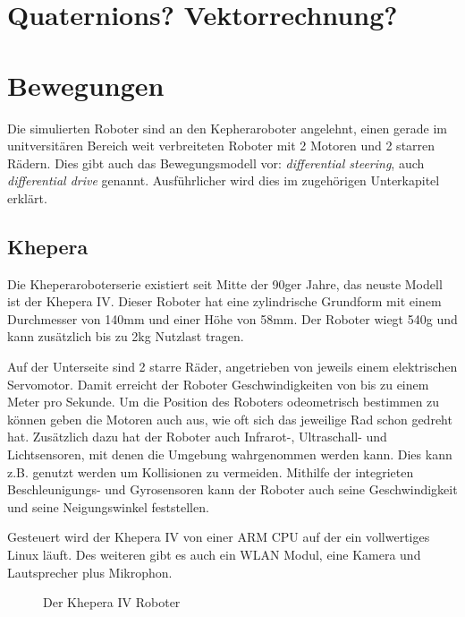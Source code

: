 \clearpage
\section{Quaternions? Vektorrechnung?}

\clearpage
\section{Bewegungen}
Die simulierten Roboter sind an den Kepheraroboter angelehnt, einen gerade im unitversit{\"{a}}ren Bereich weit verbreiteten Roboter mit 2 Motoren und 2 starren R{\"{a}}dern.
Dies gibt auch das Bewegungsmodell vor: \textit{differential steering}, auch \textit{differential drive} genannt. Ausf{\"{u}}hrlicher wird dies im zugeh{\"{o}}rigen Unterkapitel erkl{\"{a}}rt.

\subsection{Khepera}\label{khepera}
Die Kheperaroboterserie existiert seit Mitte der 90ger Jahre, das neuste Modell ist der Khepera IV. Dieser Roboter hat eine zylindrische Grundform mit einem Durchmesser von 140mm und einer
H{\"{o}}he von 58mm. Der Roboter wiegt 540g und kann zus{\"{a}}tzlich bis zu 2kg Nutzlast tragen.

Auf der Unterseite sind 2 starre R{\"{a}}der, angetrieben von jeweils einem elektrischen Servomotor. Damit erreicht der Roboter Geschwindigkeiten von bis zu einem Meter pro Sekunde.
Um die Position des Roboters odeometrisch bestimmen zu k{\"{o}}nnen geben die Motoren auch aus, wie oft sich das jeweilige Rad schon gedreht hat. Zus{\"{a}}tzlich dazu hat der Roboter
auch Infrarot-, Ultraschall- und Lichtsensoren, mit denen die Umgebung wahrgenommen werden kann. Dies kann z.B. genutzt werden um Kollisionen zu vermeiden.
Mithilfe der integrieten Beschleunigungs- und Gyrosensoren kann der Roboter auch seine Geschwindigkeit und seine Neigungswinkel feststellen.

Gesteuert wird der Khepera IV von einer ARM CPU auf der ein vollwertiges Linux l{\"{a}}uft. Des weiteren gibt es auch ein WLAN Modul, eine Kamera und Lautsprecher plus Mikrophon.

\begin{figure}
	\centering
	\caption{Der Khepera IV Roboter}
	\label{fig:kheperaiv}
\end{figure}

